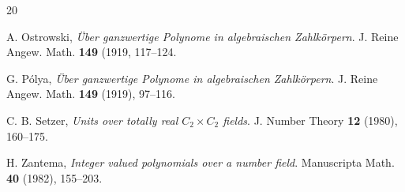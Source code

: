 \documentclass{jams-l}
\theoremstyle{definition}
\theoremstyle{remark}
\numberwithin{equation}{section}
\begin{document}
\begin{thebibliography}{20}
 
 A. Ostrowski, \textit{\"Uber ganzwertige Polynome in algebraischen Zahlk\"orpern}. J. Reine Angew. Math. \textbf{149} (1919, 117--124.


 G. P\'olya, \textit{\"Uber ganzwertige Polynome in algebraischen Zahlk\"orpern}. J. Reine Angew. Math. \textbf{149} (1919), 97--116.

 C. B. Setzer, \textit{Units over totally real $C_2\times C_{2}$ fields}.
 J. Number Theory  \textbf{12} (1980), 160--175. 
 
 H. Zantema, \textit{Integer valued polynomials over a number field}. Manuscripta Math. \textbf{40} (1982), 155--203.

\end{thebibliography}
\end{document}
